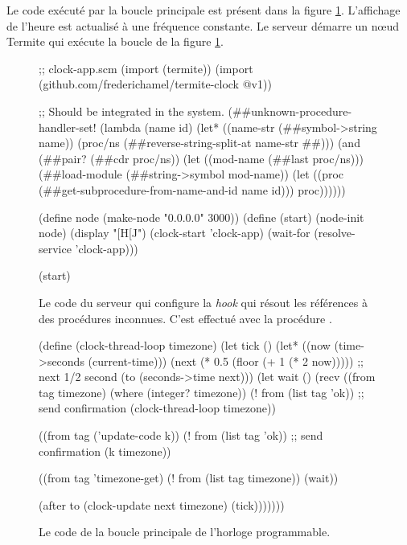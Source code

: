 Le code exécuté par la boucle principale est présent dans la figure
\ref{fig:termite-clock@v1}. L'affichage de l'heure est actualisé à
une fréquence constante. Le serveur démarre un nœud Termite qui
exécute la boucle de la figure \ref{fig:termite-clock@v1}.

\begin{figure}[h!]
\begin{center}
\begin{mplisting}{1}
;; clock-app.scm
(import (termite))
(import (github.com/frederichamel/termite-clock @v1))

;; Should be integrated in the system.
(##unknown-procedure-handler-set!
  (lambda (name id)
    (let* ((name-str (##symbol->string name))
           (proc/ns (##reverse-string-split-at name-str #\#)))
      (and (##pair? (##cdr proc/ns))
           (let ((mod-name (##last proc/ns)))
             (##load-module (##string->symbol mod-name))
             (let ((proc (##get-subprocedure-from-name-and-id name id)))
               proc))))))

(define node (make-node "0.0.0.0" 3000))
(define (start)
  (node-init node)
  (display "[H[J")
  (clock-start 'clock-app)
  (wait-for (resolve-service 'clock-app)))

(start)
\end{mplisting}
\end{center}
  \caption{Le code du serveur qui configure la \textit{hook}
    qui résout les références à des procédures inconnues.
    C'est effectué avec la procédure .
    }
  \vspace*{4ex}
\end{figure}


\begin{figure}[h!]
  \centering
\begin{mplisting}{1}
(define (clock-thread-loop timezone)
  (let tick ()
    (let* ((now (time->seconds (current-time)))
           (next (* 0.5 (floor (+ 1 (* 2 now))))) ;; next 1/2 second
           (to (seconds->time next)))
      (let wait ()
        (recv
          ((from tag timezone) (where (integer? timezone))
           (! from (list tag 'ok)) ;; send confirmation
           (clock-thread-loop timezone))

          ((from tag ('update-code k))
           (! from (list tag 'ok)) ;; send confirmation
           (k timezone))

          ((from tag 'timezone-get)
           (! from (list tag timezone))
           (wait))

          (after to
           (clock-update next timezone)
           (tick)))))))
\end{mplisting}
  \caption{Le code de la boucle principale de l'horloge programmable.}
  \label{fig:termite-clock@v1}
\end{figure}

